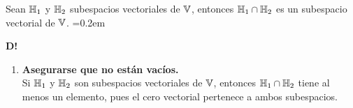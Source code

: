 \begin{teorema}
{
    Sean $\mathbb{H}_1$ y $\mathbb{H}_2$ subespacios vectoriales de $\mathbb{V}$, entonces $\mathbb{H}_1 \cap \mathbb{H}_2$ es un subespacio vectorial de $\mathbb{V}$. {\fboxsep=0.2em }

    \textbf{D!}

    \begin{enumerate}
        \item \textbf{Asegurarse que no están vacíos.} \\
            Si $\mathbb{H}_1$ y $\mathbb{H}_2$ son subespacios vectoriales de $\mathbb{V}$, entonces $\mathbb{H}_1 \cap \mathbb{H}_2$ tiene al menos un elemento, pues el cero vectorial pertenece a ambos subespacios. \\
    \end{enumerate}
}
\end{teorema}